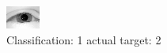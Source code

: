 \begin{figure}[h!]
\begin{center}
\includegraphics[width=0.60\columnwidth]{figures/ID2314_class_1_target_2.png}
\end{center}
\caption{ Classification: 1 actual target: 2}
\label{fig:ID2314_class_1_target_2}
\end{figure}

